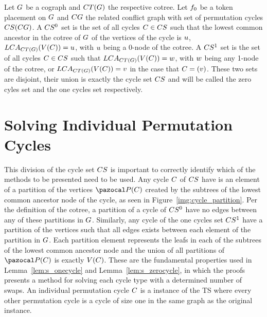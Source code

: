 \documentclass[msc,english,table,xcdraw]{ppgccufmg}
\begin{document}

Let $G$ be a cograph and $CT(G)$ the respective cotree. 
Let $f_{0}$ be a token placement on $G$ and $CG$ the related 
conflict graph with set of permutation cycles $CS(CG)$.
A $CS^{0}$ set is the set of all cycles $C \in CS$ such that
the lowest common ancestor in the cotree of $G$ of the vertices of the cycle
is $u$, $LCA_{CT(G)}(V(C)) = u$, with 
$u$ being a 0-node of the cotree.
A $CS^{1}$ set is the set of all cycles $C \in CS$ such that
$LCA_{CT(G)}(V(C)) = w$, with $w$ being any
1-node of the cotree, or $LCA_{CT(G)}(V(C)) = v$ 
in the case that $C = (v)$.
These two sets are disjoint, their union is exactly the cycle set $CS$ and
will be called the zero cyles set and the one cycles set respectively.


\section{Solving Individual Permutation Cycles}
\label{sec:solvindpermcycles}

This division of the cycle set $CS$ is important to correctly identify which
of the methods to be presented need to be used.
Any cycle $C$ of  $CS$ have is an element of a partition of the vertices $\partitionFunc
{\cycle}$ created by the subtrees of the lowest common ancestor node of the cycle, 
as seen in Figure~\ref{img:cycle_partition}. 
Per the definition of the cotree, a partition of a cycle of $CS^{0}$ have no 
edges between any of these partitions in $G$.
Similarly, any cycle of the one cycles set $CS^{1}$ have a partition of the
vertices such that all edges exists between each element of the partition in $G$.
Each partition element represents the leafs in each of the subtrees of the lowest 
common ancestor node and the union of all partitions of $\partitionFunc{\cycle}$ is 
exactly $V(C)$.
These are the fundamental properties used in Lemma~\ref{lem:s_onecycle} and 
Lemma~\ref{lem:s_zerocycle}, in which the proofs presents a method for solving 
each cycle type with a determined number of swaps.
An individual permutation cycle $C$ is a instance of the TS where every other
permutation cycle is a cycle of size one in the same graph as the original
instance.
\end{document}
